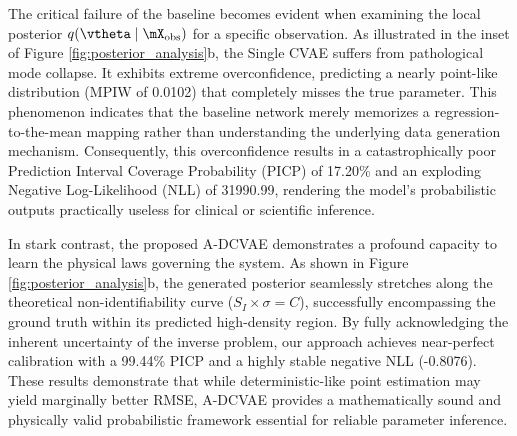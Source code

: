 The critical failure of the baseline becomes evident when examining the local posterior $q(\vtheta \mid \mX_{\mathrm{obs}})$ for a specific observation. As illustrated in the inset of Figure \ref{fig:posterior_analysis}b, the Single CVAE suffers from pathological mode collapse. It exhibits extreme overconfidence, predicting a nearly point-like distribution (MPIW of 0.0102) that completely misses the true parameter. This phenomenon indicates that the baseline network merely memorizes a regression-to-the-mean mapping rather than understanding the underlying data generation mechanism. Consequently, this overconfidence results in a catastrophically poor Prediction Interval Coverage Probability (PICP) of 17.20\% and an exploding Negative Log-Likelihood (NLL) of 31990.99, rendering the model's probabilistic outputs practically useless for clinical or scientific inference.

\begin{table}[b]
    \centering
    \caption{Quantitative evaluation of parameter estimation and uncertainty calibration.}
    \label{tab:quantitative_results}
\end{table}

In stark contrast, the proposed A-DCVAE demonstrates a profound capacity to learn the physical laws governing the system. As shown in Figure \ref{fig:posterior_analysis}b, the generated posterior seamlessly stretches along the theoretical non-identifiability curve ($S_I \times \sigma = C$), successfully encompassing the ground truth within its predicted high-density region. By fully acknowledging the inherent uncertainty of the inverse problem, our approach achieves near-perfect calibration with a 99.44\% PICP and a highly stable negative NLL (-0.8076). These results demonstrate that while deterministic-like point estimation may yield marginally better RMSE, A-DCVAE provides a mathematically sound and physically valid probabilistic framework essential for reliable parameter inference.

